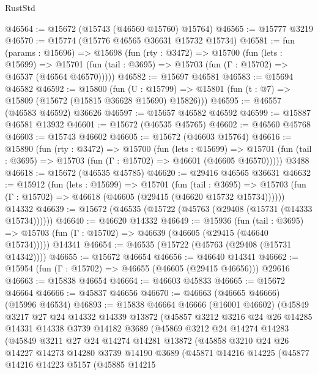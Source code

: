 \begin{lexlean}{RustStd}
\begin{coremodule}
@46564 := @15672 (@15743 (@46560 @15760) @15764)
@46565 := @15777 @3219
@46570 := @15774 (@15776 @46565 @36631 @15732 @15734)
@46581 := fun (params : @15696) =>
  @15698
    (fun (rty : @3472) =>
    @15700
      (fun (lets : @15699) =>
      @15701 (fun (tail : @3695) => @15703 (fun (Γ : @15702) => @46537 (@46564 @46570)))))
@46582 := @15697 @46581
@46583 := @15694 @46582
@46592 := @15800
    (fun (U : @15799) => @15801 (fun (t : @7) => @15809 (@15672 (@15815 @36628 @15690) @15826)))
@46595 := @46557 (@46583 @46592) @36626
@46597 := @15657 @46582 @46592
@46599 := @15887 @46581 @13932
@46601 := @15672 (@46535 @45765)
@46602 := @46560 @45768
@46603 := @15743 @46602
@46605 := @15672 (@46603 @15764)
@46616 := @15890
    (fun (rty : @3472) =>
    @15700
      (fun (lets : @15699) =>
      @15701 (fun (tail : @3695) => @15703 (fun (Γ : @15702) => @46601 (@46605 @46570)))))
    @3488
@46618 := @15672 (@46535 @45785)
@46620 := @29416 @46565 @36631
@46632 := @15912
    (fun (lets : @15699) =>
    @15701
      (fun (tail : @3695) =>
      @15703 (fun (Γ : @15702) => @46618 (@46605 (@29415 (@46620 @15732 @15734))))))
    @14332
@46639 := @15672 (@46535 (@15722 (@45763 (@29408 (@15731 (@14333 @15734))))))
@46640 := @46620 @14332
@46649 := @15936
    (fun (tail : @3695) => @15703 (fun (Γ : @15702) => @46639 (@46605 (@29415 (@46640 @15734)))))
    @14341
@46654 := @46535 (@15722 (@45763 (@29408 (@15731 @14342))))
@46655 := @15672 @46654
@46656 := @46640 @14341
@46662 := @15954 (fun (Γ : @15702) => @46655 (@46605 (@29415 @46656))) @29616
@46663 := @15838 @46654
@46664 := @46603 @45833
@46665 := @15672 @46664
@46666 := @45837 @46656
@46670 := @46663 (@46665 @46666) (@15996 @46534)
@46893 := @15838
    @46664
    @46666
    (@16001 @46602)
    (@45849
      @3217
      @27
      @24
      @14332
      @14339
      @13872
      (@45857
        @3212
        @3216
        @24
        @26
        @14285
        @14331
        @14338
        @3739
        @14182
        @3689
        (@45869
          @3212
          @24
          @14274
          @14283
          (@45849
            @3211
            @27
            @24
            @14274
            @14281
            @13872
            (@45858
              @3210
              @24
              @26
              @14227
              @14273
              @14280
              @3739
              @14190
              @3689
              (@45871
                @14216
                @14225
                (@45877
                  @14216
                  @14223
                  @5157
                  (@45885
                    @14215

\end{coremodule}
\end{lexlean}
